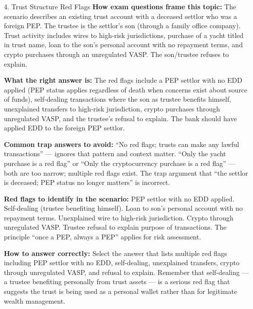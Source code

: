\documentclass[11pt,a4paper]{beamer}
\begin{document}
	\begin{frame}{4. Trust Structure Red Flags}
		\tiny
		\noindent\textbf{How exam questions frame this topic:} The scenario describes an existing trust account with a deceased settlor who was a foreign PEP. The trustee is the settlor's son (through a family office company). Trust activity includes wires to high-risk jurisdictions, purchase of a yacht titled in trust name, loan to the son's personal account with no repayment terms, and crypto purchases through an unregulated VASP. The son/trustee refuses to explain.
		
		\vspace{0.1cm}
		\noindent\textbf{What the right answer is:} The red flags include a PEP settlor with no EDD applied (PEP status applies regardless of death when concerns exist about source of funds), self-dealing transactions where the son as trustee benefits himself, unexplained transfers to high-risk jurisdiction, crypto purchases through unregulated VASP, and the trustee's refusal to explain. The bank should have applied EDD to the foreign PEP settlor.
		
		\vspace{0.1cm}
		\noindent\textbf{Common trap answers to avoid:} “No red flags; trusts can make any lawful transactions” — ignores that pattern and context matter. “Only the yacht purchase is a red flag” or “Only the cryptocurrency purchase is a red flag” — both are too narrow; multiple red flags exist. The trap argument that “the settlor is deceased; PEP status no longer matters” is incorrect.
		
		\vspace{0.1cm}
		\noindent\textbf{Red flags to identify in the scenario:} PEP settlor with no EDD applied. Self-dealing (trustee benefiting himself). Loan to son's personal account with no repayment terms. Unexplained wire to high-risk jurisdiction. Crypto through unregulated VASP. Trustee refusal to explain purpose of transactions. The principle “once a PEP, always a PEP” applies for risk assessment.
		
		\vspace{0.1cm}
		\noindent\textbf{How to answer correctly:} Select the answer that lists multiple red flags including PEP settlor with no EDD, self-dealing, unexplained transfers, crypto through unregulated VASP, and refusal to explain. Remember that self-dealing — a trustee benefiting personally from trust assets — is a serious red flag that suggests the trust is being used as a personal wallet rather than for legitimate wealth management.
	\end{frame}
	
\end{document}
